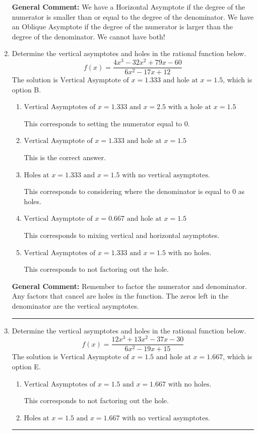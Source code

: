 \documentclass{extbook}[14pt]
\newcommand{\litem}[1]{\item #1

\rule{\textwidth}{0.4pt}}
\begin{document}
\begin{enumerate}
{\textbf{General Comment:} We have a Horizontal Asymptote if the degree of the numerator is smaller than or equal to the degree of the denominator. We have an Oblique Asymptote if the degree of the numerator is larger than the degree of the denominator. We cannot have both!
}
\litem{
Determine the vertical asymptotes and holes in the rational function below.
\[ f(x) = \frac{4x^{3} -32 x^{2} +79 x -60}{6x^{2} -17 x + 12} \]The solution is \( \text{Vertical Asymptote of } x = 1.333 \text{ and hole at } x = 1.5 \), which is option B.\begin{enumerate}[label=\Alph*.]
\item \( \text{Vertical Asymptotes of } x = 1.333 \text{ and } x = 2.5 \text{ with a hole at } x = 1.5 \)

This corresponds to setting the numerator equal to 0.
\item \( \text{Vertical Asymptote of } x = 1.333 \text{ and hole at } x = 1.5 \)

This is the correct answer.
\item \( \text{Holes at } x = 1.333 \text{ and } x = 1.5 \text{ with no vertical asymptotes.} \)

This corresponds to considering where the denominator is equal to 0 as holes.
\item \( \text{Vertical Asymptote of } x = 0.667 \text{ and hole at } x = 1.5 \)

This corresponds to mixing vertical and horizontal asymptotes.
\item \( \text{Vertical Asymptotes of } x = 1.333 \text{ and } x = 1.5 \text{ with no holes.} \)

This corresponds to not factoring out the hole.
\end{enumerate}

\textbf{General Comment:} Remember to factor the numerator and denominator. Any factors that cancel are holes in the function. The zeros left in the denominator are the vertical asymptotes.
}
\litem{
Determine the vertical asymptotes and holes in the rational function below.
\[ f(x) = \frac{12x^{3} +13 x^{2} -37 x -30}{6x^{2} -19 x + 15} \]The solution is \( \text{Vertical Asymptote of } x = 1.5 \text{ and hole at } x = 1.667 \), which is option E.\begin{enumerate}[label=\Alph*.]
\item \( \text{Vertical Asymptotes of } x = 1.5 \text{ and } x = 1.667 \text{ with no holes.} \)

This corresponds to not factoring out the hole.
\item \( \text{Holes at } x = 1.5 \text{ and } x = 1.667 \text{ with no vertical asymptotes.} \)


\end{enumerate}}
\end{enumerate}
\end{document}
